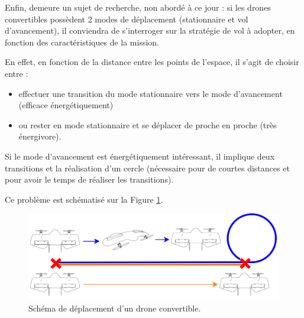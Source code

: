 Enfin, demeure un sujet de recherche, non abordé à ce jour : si les drones convertibles possèdent 2 modes de déplacement (stationnaire et vol d'avancement), il conviendra de s'interroger sur la stratégie de vol à adopter, en fonction des caractéristiques de la mission.

En effet, en fonction de la distance entre les points de l'espace, il s'agit de choisir entre :
\begin{itemize}
    \item effectuer une transition du mode stationnaire vers le mode d'avancement (efficace énergétiquement)
    \item ou rester en mode stationnaire et se déplacer de proche en proche (très énergivore).
\end{itemize}

Si le mode d'avancement est énergétiquement intéressant, il implique deux transitions et la réalisation d'un cercle (nécessaire pour de courtes distances et pour avoir le temps de réaliser les transitions).

Ce problème est schématisé sur la Figure \ref{fig:pbhybride}.



\begin{figure}[ht!]
    \centerline{
    \includegraphics[trim=0cm 0cm 0cm 0cm,clip,width=0.8\columnwidth]{figures/DroneConvertibleGuidage.png}}
    \caption{Schéma de déplacement d'un drone convertible.}
    \label{fig:pbhybride}
\end{figure}


